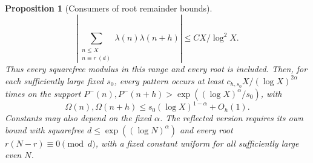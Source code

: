 \documentclass[11pt]{article}
\newtheorem{proposition}[theorem]{Proposition}
\theoremstyle{definition}
\theoremstyle{remark}
\numberwithin{equation}{section}
\begin{document}
\begin{proposition}[Consumers of root remainder bounds]
\begin{equation}
 \left|\sum_{\substack{n\le X\\n\equiv r\ (d)}}\lambda(n)\lambda(n+h)\right|
 \le CX/\log^2X.
\end{equation}
Thus every squarefree modulus in this range and every root is included.
Then, for each sufficiently large fixed $s_0$, every pattern occurs at least $c_{h,s_0}X/(\log X)^{2\alpha}$ times on the support
$P^-(n),P^-(n+h)>\exp((\log X)^\alpha/s_0)$, with
\begin{equation}\label{eq:growing-omega}
 \Omega(n),\Omega(n+h)\le s_0(\log X)^{1-\alpha}+O_h(1).
\end{equation}
Constants may also depend on the fixed $\alpha$.
The reflected version requires its own bound with squarefree $d\le\exp((\log N)^\alpha)$ and every
root $r(N-r)\equiv0\pmod d$, with a fixed constant uniform for all sufficiently large even $N$.
\end{proposition}
\end{document}
